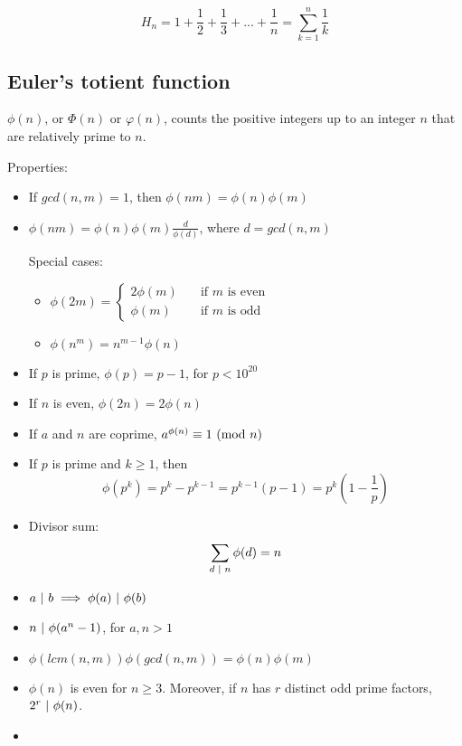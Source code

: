 $$H_n = 1 + \frac{1}{2} + \frac{1}{3} + ... + \frac{1}{n} = \sum_{k=1}^n \frac{1}{k}$$

\subsection*{Euler's totient function}

$\phi (n)$, or $\Phi (n)$ or $\varphi (n)$, counts the positive integers up to an integer $n$ that are relatively prime to $n$.

Properties:
\begin{itemize}
    \item If $gcd(n, m) = 1$, then $\phi (nm) = \phi (n) \phi (m)$
    \item $\phi (nm) = \phi (n) \phi (m) \frac{d}{\phi (d)}$, where $d = gcd(n, m)$
    
    Special cases:
    \begin{itemize}
        \item 
        $\phi (2m) = 
        \begin{cases}
            2 \phi (m) &\quad\text{if } m \text{ is even} \\
            \phi (m) &\quad\text{if } m \text{ is odd}
        \end{cases}$
        \item $\phi (n^m) = n^{m-1} \phi(n)$
    \end{itemize}
    \item If $p$ is prime, $\phi (p) = p-1$, for $p < 10^{20}$
    \item If $n$ is even, $\phi (2n) = 2 \phi(n)$
    \item If $a$ and $n$ are coprime, $a^{\phi (n)} \equiv 1 \text{ } ( \text{mod } n )$
    \item If $p$ is prime and $k \geq 1$, then
    $$\phi (p^k) = p^k - p^{k-1} = p^{k-1} (p - 1) = p^k (1 - \frac{1}{p})$$
    \item Divisor sum:
    $$\sum_{d \text{ } | \text{ } n} \phi(d) = n$$
    \item $a \text{ } | \text{ } b \implies \phi(a) \text{ } | \text{ } \phi(b)$
    \item $n \text{ } | \text{ } \phi(a^n - 1)$, for $a, n > 1$
    \item $\phi (lcm(n, m)) \phi( gcd(n, m)) = \phi (n) \phi (m)$
    \item $\phi (n)$ is even for $n \geq 3$. Moreover, if $n$ has $r$ distinct odd prime factors, $2^r \text{ } | \text{ } \phi(n)$.
    \item 
\end{itemize}

